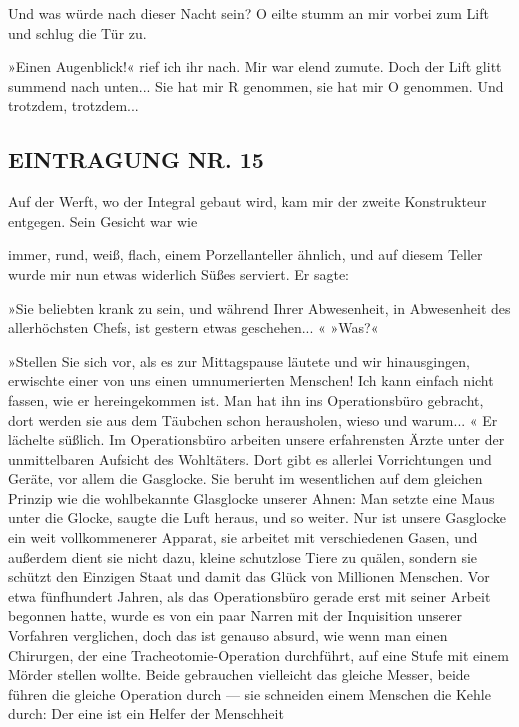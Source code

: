 Und was würde nach dieser Nacht sein? O eilte stumm an mir vorbei
zum Lift und schlug die Tür zu.

»Einen Augenblick!« rief ich ihr nach. Mir war elend zumute. Doch
der Lift glitt summend nach unten... Sie hat mir R genommen, sie
hat mir O genommen. Und trotzdem, trotzdem...

\subsection{EINTRAGUNG NR. 15}

Auf der Werft, wo der Integral gebaut wird, kam mir der zweite
Konstrukteur entgegen. Sein Gesicht war wie

immer, rund, weiß, flach, einem Porzellanteller ähnlich, und auf
diesem Teller wurde mir nun etwas widerlich Süßes serviert. Er
sagte:

»Sie beliebten krank zu sein, und während Ihrer Abwesenheit, in
Abwesenheit des allerhöchsten Chefs, ist gestern etwas geschehen...
« »Was?«

»Stellen Sie sich vor, als es zur Mittagspause läutete und wir
hinausgingen, erwischte einer von uns einen umnumerierten Menschen!
Ich kann einfach nicht fassen, wie er hereingekommen ist. Man hat
ihn ins Operationsbüro gebracht, dort werden sie aus dem Täubchen
schon herausholen, wieso und warum... « Er lächelte süßlich. Im
Operationsbüro arbeiten unsere erfahrensten Ärzte unter der
unmittelbaren Aufsicht des Wohltäters. Dort gibt es allerlei
Vorrichtungen und Geräte, vor allem die Gasglocke. Sie beruht im
wesentlichen auf dem gleichen Prinzip wie die wohlbekannte
Glasglocke unserer Ahnen: Man setzte eine Maus unter die Glocke,
saugte die Luft heraus, und so weiter. Nur ist unsere Gasglocke ein
weit vollkommenerer Apparat, sie arbeitet mit verschiedenen Gasen,
und außerdem dient sie nicht dazu, kleine schutzlose Tiere zu
quälen, sondern sie schützt den Einzigen Staat und damit das Glück
von Millionen Menschen. Vor etwa fünfhundert Jahren, als das
Operationsbüro gerade erst mit seiner Arbeit begonnen hatte, wurde
es von ein paar Narren mit der Inquisition unserer Vorfahren
verglichen, doch das ist genauso absurd, wie wenn man einen
Chirurgen, der eine Tracheotomie-Operation durchführt, auf eine
Stufe mit einem Mörder stellen wollte. Beide gebrauchen vielleicht
das gleiche Messer, beide führen die gleiche Operation durch — sie
schneiden einem Menschen die Kehle durch: Der eine ist ein Helfer
der Menschheit

